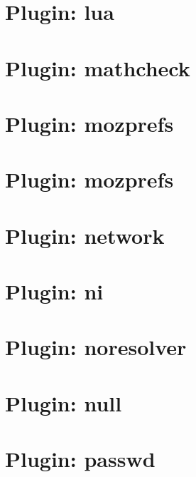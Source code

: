 \documentclass[twoside]{book}
\newcommand{\+}{\discretionary{\mbox{\scriptsize$\hookleftarrow$}}{}{}}
\begin{document}
\chapter{Plugin\+: lua}
\label{md_src_plugins_lua_README}
\hypertarget{md_src_plugins_lua_README}{}

\chapter{Plugin\+: mathcheck}
\label{md_src_plugins_mathcheck_README}
\hypertarget{md_src_plugins_mathcheck_README}{}

\chapter{Plugin\+: mozprefs}
\label{md_src_plugins_mozprefs_autoconfig_README}
\hypertarget{md_src_plugins_mozprefs_autoconfig_README}{}

\chapter{Plugin\+: mozprefs}
\label{md_src_plugins_mozprefs_README}
\hypertarget{md_src_plugins_mozprefs_README}{}

\chapter{Plugin\+: network}
\label{md_src_plugins_network_README}
\hypertarget{md_src_plugins_network_README}{}

\chapter{Plugin\+: ni}
\label{md_src_plugins_ni_README}
\hypertarget{md_src_plugins_ni_README}{}

\chapter{Plugin\+: noresolver}
\label{md_src_plugins_noresolver_README}
\hypertarget{md_src_plugins_noresolver_README}{}

\chapter{Plugin\+: null}
\label{md_src_plugins_null_README}
\hypertarget{md_src_plugins_null_README}{}

\chapter{Plugin\+: passwd}
\label{md_src_plugins_passwd_README}
\hypertarget{md_src_plugins_passwd_README}{}

\end{document}
